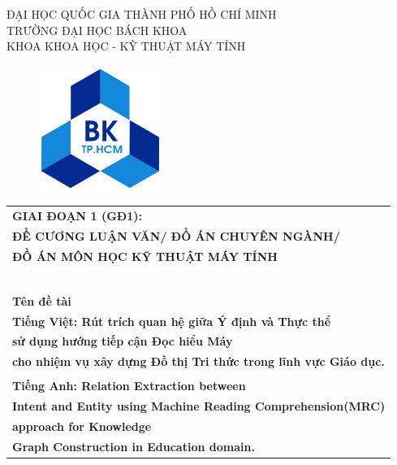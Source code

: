 \begin{titlepage}
    \begin{center}
        ĐẠI HỌC QUỐC GIA THÀNH PHỐ HỒ CHÍ MINH \\
        TRƯỜNG ĐẠI HỌC BÁCH KHOA \\
        KHOA KHOA HỌC - KỸ THUẬT MÁY TÍNH
    \end{center}
    \vspace{1cm}
    \begin{figure}[h!]
        \begin{center}
            \includegraphics[width=4cm]{image/local/hcmut}
        \end{center}\label{fig:figure}
    \end{figure}
    \vspace{1cm}
    \begin{center}
        \begin{tabular}{c}
            \multicolumn{1}{l}{\textbf{{\Large GIAI ĐOẠN 1 (GĐ1):}}}                                       \\
            \multicolumn{1}{l}{\textbf{{ĐỀ CƯƠNG LUẬN VĂN/ ĐỒ ÁN CHUYÊN NGÀNH/}}}                          \\
            \multicolumn{1}{l}{\textbf{{ĐỒ ÁN MÔN HỌC KỸ THUẬT MÁY TÍNH}}}                                 \\
            ~~                                                                                             \\
            \hline
            \\
            \multicolumn{1}{l}{\textbf{{\Large Tên đề tài}}}\\
            \multicolumn{1}{l}{\textbf{{Tiếng Việt: Rút trích quan hệ giữa Ý định và Thực thể}}}                            \\
            \multicolumn{1}{l}{\textbf{{ sử dụng hướng tiếp cận Đọc hiểu Máy}}}\\
            \multicolumn{1}{l}{\textbf{{ cho nhiệm vụ xây dựng Đồ thị Tri thức trong lĩnh vực Giáo dục.}}}                          \\
            \\
            \multicolumn{1}{l}{\textbf{{Tiếng Anh: Relation Extraction between}}}\\
            \multicolumn{1}{l}{\textbf{{ Intent and Entity using Machine Reading Comprehension(MRC)}}}\\
            \multicolumn{1}{l}{\textbf{{ approach for Knowledge}}}\\
            \multicolumn{1}{l}{\textbf{{ Graph Construction in Education domain.}}}\\



\end{tabular}
\end{center}
\end{titlepage}
